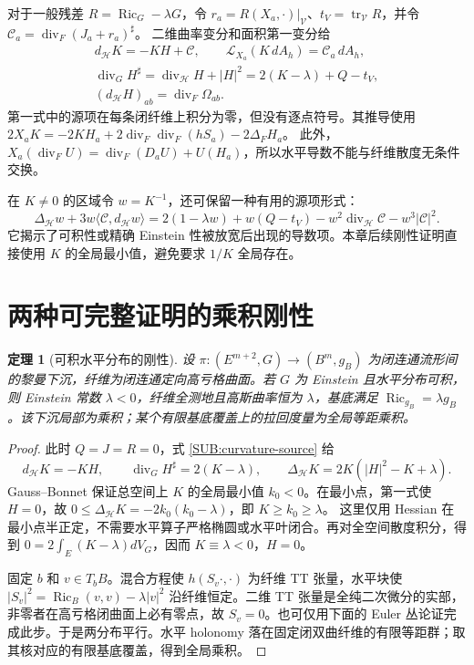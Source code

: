 \documentclass[UTF8,fontset=fandol,zihao=-4,oneside,openany]{ctexbook}
\theoremstyle{cjkplain}
\newtheorem{theorem}{定理}[chapter]
\numberwithin{equation}{chapter}
\begin{document}
对于一般残差 $R=\operatorname{Ric}_G-\lambda G$，令
$r_a=R(X_a,\cdot)|_{\mathcal V}$、$t_V=\operatorname{tr}_{\mathcal V}R$，并令
$\mathcal C_a=\operatorname{div}_F(J_a+r_a)^\sharp$。
二维曲率变分和面积第一变分给
\begin{equation}\label{SUB:curvature-source}
\begin{gathered}
d_{\mathcal H}K=-KH+\mathcal C,
\qquad \mathcal L_{X_a}(K\,dA_h)=\mathcal C_a\,dA_h,\\
\operatorname{div}_G H^\sharp
 =\operatorname{div}_{\mathcal H}H+|H|^2
 =2(K-\lambda)+Q-t_V,\\
(d_{\mathcal H}H)_{ab}=\operatorname{div}_F\Omega_{ab}.
\end{gathered}
\end{equation}
第一式中的源项在每条闭纤维上积分为零，但没有逐点符号。其推导使用
$2X_aK=-2KH_a+2\operatorname{div}_F\operatorname{div}_F(hS_a)-2\Delta_FH_a$。
此外，$X_a(\operatorname{div}_FU)=\operatorname{div}_F(D_aU)+U(H_a)$，所以水平导数不能与纤维散度无条件交换。

在 $K\ne0$ 的区域令 $w=K^{-1}$，还可保留一种有用的源项形式：
\begin{equation}\label{SUB:inverse-curvature}
\Delta_{\mathcal H}w+3w\langle\mathcal C,d_{\mathcal H}w\rangle
=2(1-\lambda w)+w(Q-t_V)
-w^2\operatorname{div}_{\mathcal H}\mathcal C-w^3|\mathcal C|^2.
\end{equation}
它揭示了可积性或精确 Einstein 性被放宽后出现的导数项。本章后续刚性证明直接使用 $K$ 的全局最小值，避免要求 $1/K$ 全局存在。

\section{两种可完整证明的乘积刚性}

\begin{theorem}[可积水平分布的刚性]\label{SUB:integrable}
设 $\pi:(E^{m+2},G)\to(B^m,g_B)$ 为闭连通流形间的黎曼下沉，纤维为闭连通定向高亏格曲面。若 $G$ 为 Einstein 且水平分布可积，则 Einstein 常数 $\lambda<0$，纤维全测地且高斯曲率恒为 $\lambda$，基底满足 $\operatorname{Ric}_{g_B}=\lambda g_B$。该下沉局部为乘积；某个有限基底覆盖上的拉回度量为全局等距乘积。
\end{theorem}

\begin{proof}
此时 $Q=J=R=0$，式 \eqref{SUB:curvature-source} 给
\[
d_{\mathcal H}K=-KH,\qquad
\operatorname{div}_G H^\sharp=2(K-\lambda),\qquad
\Delta_{\mathcal H}K=2K(|H|^2-K+\lambda).
\]
Gauss--Bonnet 保证总空间上 $K$ 的全局最小值 $k_0<0$。在最小点，第一式使 $H=0$，故
$0\le\Delta_{\mathcal H}K=-2k_0(k_0-\lambda)$，即 $K\ge k_0\ge\lambda$。
这里仅用 Hessian 在最小点半正定，不需要水平算子严格椭圆或水平叶闭合。再对全空间散度积分，得到
$0=2\int_E(K-\lambda)dV_G$，因而 $K\equiv\lambda<0$，$H=0$。

固定 $b$ 和 $v\in T_bB$。混合方程使 $h(S_v\cdot,\cdot)$ 为纤维 TT 张量，水平块使
$|S_v|^2=\operatorname{Ric}_B(v,v)-\lambda|v|^2$ 沿纤维恒定。二维 TT 张量是全纯二次微分的实部，非零者在高亏格闭曲面上必有零点，故 $S_v=0$。也可仅用下面的 Euler 丛论证完成此步。于是两分布平行。水平 holonomy 落在固定闭双曲纤维的有限等距群；取其核对应的有限基底覆盖，得到全局乘积。
\end{proof}
\end{document}
